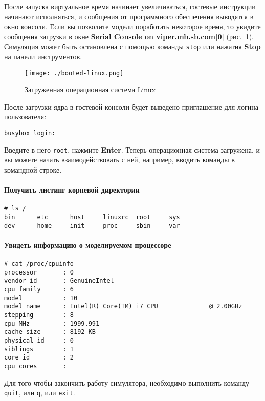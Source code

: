 После запуска виртуальное время начинает увеличиваться, гостевые инструкции начинают исполняться, и сообщения от программного обеспечения выводятся в окно консоли. Если вы позволите модели поработать некоторое время, то увидите сообщения загрузки в окне \textbf{Serial Console on viper.mb.sb.com[0]} (рис.~\ref{fig:booted-linux}). Симуляция может быть остановлена с помощью команды \texttt{stop} или нажатия \textbf{Stop} на панели инструментов.

\begin{figure}
	\centering
	\texttt{[image: ./booted-linux.png]}
	\caption{Загруженная операционная система Linux}
	\label{fig:booted-linux}
\end{figure}

После загрузки ядра в гостевой консоли будет выведено приглашение для логина пользователя:
\begin{lstlisting}
busybox login:
\end{lstlisting}

Введите в него \texttt{root}, нажмите \textbf{Enter}. Теперь операционная система загружена, и вы можете начать взаимодействовать с ней, например, вводить команды в командной строке.

\paragraph{Получить листинг корневой директории}
\begin{lstlisting}
# ls /
bin      etc      host     linuxrc  root     sys
dev      home     init     proc     sbin     var
\end{lstlisting}

\paragraph{Увидеть информацию о моделируемом процессоре}
\begin{lstlisting}
# cat /proc/cpuinfo 
processor       : 0
vendor_id       : GenuineIntel
cpu family      : 6
model           : 10
model name      : Intel(R) Core(TM) i7 CPU              @ 2.00GHz
stepping        : 8
cpu MHz         : 1999.991
cache size      : 8192 KB
physical id     : 0
siblings        : 1
core id         : 2
cpu cores       : 
\end{lstlisting}

Для того чтобы закончить работу симулятора, необходимо выполнить команду \texttt{quit}, или \texttt{q}, или \texttt{exit}.

